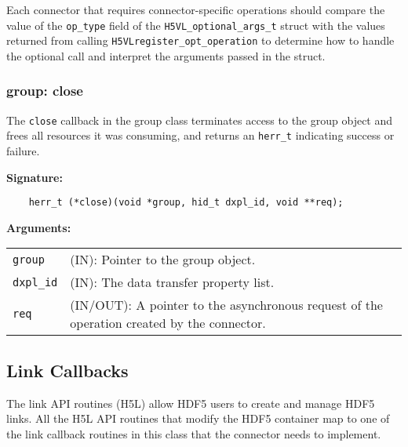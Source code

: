 Each connector that requires connector-specific operations should compare the
value of the {\tt op\_type} field of the {\tt H5VL\_optional\_args\_t} struct
with the values returned from calling {\tt H5VLregister\_opt\_operation} to
determine how to handle the optional call and interpret the arguments passed
in the struct.

\subsubsection{group: close}
The \texttt{close} callback in the group class terminates access to
the group object and frees all resources it was consuming, and returns
an \texttt{herr\_t} indicating success or failure.\bigskip

\begin{mdframed}[style=bgbox]
\textbf{Signature:}
\begin{lstlisting}
    herr_t (*close)(void *group, hid_t dxpl_id, void **req);
\end{lstlisting}

\textbf{Arguments:}\\
\begin{tabular}{l p{13.5cm}}
  \texttt{group} & (IN): Pointer to the group object.\\
  \texttt{dxpl\_id} & (IN): The data transfer property list.\\
  \texttt{req} & (IN/OUT): A pointer to the asynchronous request of the
  operation created by the connector.\\
\end{tabular}
\end{mdframed}


\subsection{Link Callbacks}
The link API routines (H5L) allow HDF5 users to create and manage
HDF5 links. All the H5L API routines that modify the HDF5 container
map to one of the link callback routines in this class that the
connector needs to implement.

